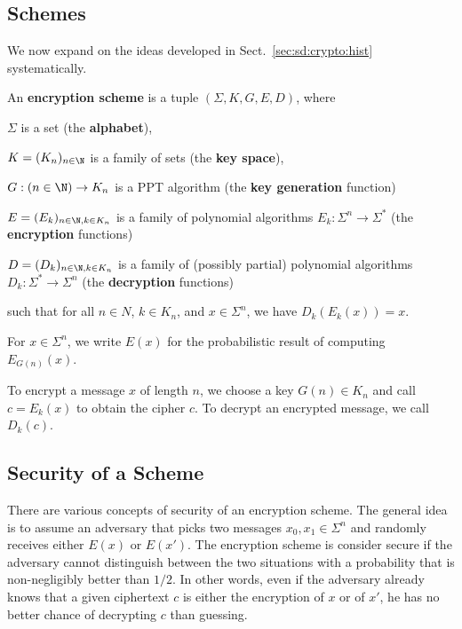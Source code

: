 \subsection{Schemes}

We now expand on the ideas developed in Sect.~\ref{sec:sd:crypto:hist} systematically.

\begin{definition}
 An \textbf{encryption scheme} is a tuple $(\Sigma,K,G, E, D)$, where
  \begin{compactitem}
   \item $\Sigma$ is a set (the \textbf{alphabet}),
   \item $K=(K_n)_{n\in \N}$ is a family of sets (the \textbf{key space}),
   \item $G:(n\in \N)\to K_n$ is a PPT algorithm (the \textbf{key generation} function)
   \item $E=(E_k)_{n\in\N,k\in K_n}$ is a family of polynomial algorithms $E_k:\Sigma^n\to\Sigma^*$ (the \textbf{encryption} functions)
   \item $D=(D_k)_{n\in\N,k\in K_n}$ is a family of (possibly partial) polynomial algorithms $D_k:\Sigma^*\to\Sigma^n$ (the \textbf{decryption} functions)
  \end{compactitem}
  such that for all $n\in N$, $k\in K_n$, and $x\in \Sigma^n$, we have $D_k(E_k(x))=x$.

  For $x\in\Sigma^n$, we write $E(x)$ for the probabilistic result of computing $E_{G(n)}(x)$.
\end{definition}

To encrypt a message $x$ of length $n$, we choose a key $G(n)\in K_n$ and call $c=E_k(x)$ to obtain the cipher $c$.
To decrypt an encrypted message, we call $D_k(c)$.

\subsection{Security of a Scheme}

There are various concepts of security of an encryption scheme.
The general idea is to assume an adversary that picks two messages $x_0,x_1\in\Sigma^n$ and randomly receives either $E(x)$ or $E(x')$.
The encryption scheme is consider secure if the adversary cannot distinguish between the two situations with a probability that is non-negligibly better than $1/2$.
In other words, even if the adversary already knows that a given ciphertext $c$ is either the encryption of $x$ or of $x'$, he has no better chance of decrypting $c$ than guessing.

